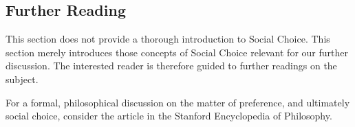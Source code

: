 \subsection{Further Reading}

This section does not provide a thorough introduction to Social Choice. This
section merely introduces those concepts of Social Choice relevant for our
further discussion. The interested reader is therefore guided to further
readings on the subject.

For a formal, philosophical discussion on the matter of preference, and
ultimately social choice, consider the article \cite{preferences} in the
Stanford Encyclopedia of Philosophy.



